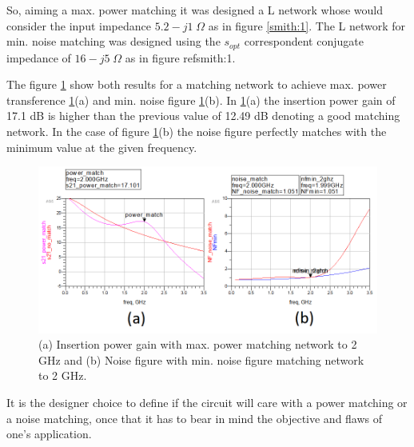 So, aiming a max. power matching it was designed a L network whose would consider the input impedance $5.2-j1 \; \Omega$ as in figure \ref{smith:1}. The L network for min. noise matching was designed using the $s_{opt}$ correspondent conjugate impedance of $16-j5 \; \Omega$ as in figure ref{smith:1}.

The figure \ref{fig:match} show both results for a matching network to achieve max. power transference \ref{fig:match}(a) and min. noise figure \ref{fig:match}(b). In \ref{fig:match}(a) the insertion power gain of 17.1 dB is higher than the previous value of 12.49 dB denoting a good matching network. In the case of figure \ref{fig:match}(b) the noise figure perfectly matches with the minimum value at the given frequency.

\begin{figure}[H] 
\centering
\includegraphics[width=15cm]{images/matches.png}
\caption{(a) Insertion power gain with max. power matching network to 2 GHz and (b) Noise figure with min. noise figure matching network to 2 GHz.}
\label{fig:match} 
\end{figure}

It is the designer choice to define if the circuit will care with a power matching or a noise matching, once that it has to bear in mind the objective and flaws of one's application.